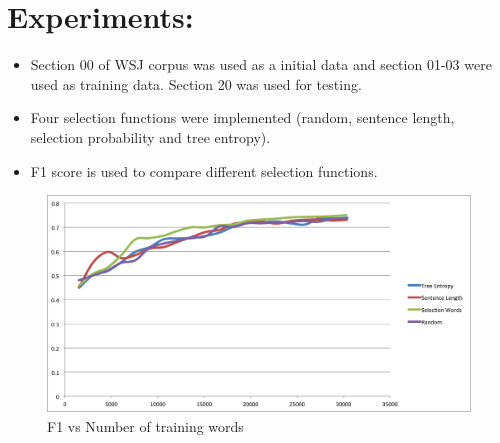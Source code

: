 \documentclass[10pt] {article}
\begin{document}



\section{Experiments:}
\begin{itemize}
\item Section 00 of WSJ corpus was used as a initial data and section 01-03 were used as training data. Section 20 was used for testing.
\item Four selection functions were implemented (random, sentence length, selection probability and tree entropy).
\item F1 score is used to compare different selection functions.
\end{itemize}

\begin{figure}[ht!]
\centering
  \includegraphics[width=\linewidth]{chart.png}
  \caption{F1 vs Number of training words}
  \label{fig:thvsfair}
\end{figure}

\end{document}
